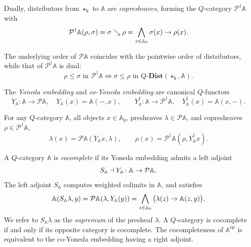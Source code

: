 \documentclass{tac}
\begin{document}
Dually, distributors from \(\star_\mathrm{k}\) to \(\mathbb{A}\) are \emph{copresheaves}, forming the \(Q\)-category \(\mathcal{P}^{\dagger}\mathbb{A}\) with
\begin{equation*}
\mathcal{P}^{\dagger}\mathbb{A}(\rho,\sigma)=\sigma\searrow\rho
=\bigwedge_{x\in\mathbb{A}_0}\sigma(x)\rightarrow\rho(x).
\end{equation*}

The underlying order of \(\mathcal{P}\mathbb{A}\) coincides with the pointwise order of distributors, while that of \(\mathcal{P}^{\dagger}\mathbb{A}\) is dual:
\begin{equation*}
\rho\leq\sigma\text{ in } \mathcal{P}^{\dagger}\mathbb{A} \iff \sigma\leq\rho\text{ in } Q\text{-}\mathbf{Dist}(\star_\mathrm{k},\mathbb{A}).
\end{equation*}

The \emph{Yoneda embedding} and \emph{co-Yoneda embedding} are canonical \(Q\)-functors
\begin{equation*}
Y_{\mathbb{A}}\colon\mathbb{A}\to\mathcal{P}\mathbb{A},\quad Y_{\mathbb{A}}(x)=\mathbb{A}(-,x),
\qquad
Y_{\mathbb{A}}^\dagger\colon\mathbb{A}\to\mathcal{P}^\dagger\mathbb{A},\quad Y_{\mathbb{A}}^\dagger(x)=\mathbb{A}(x,-).
\end{equation*}

\begin{lemma}[Yoneda] \label{lem:yoneda}
For any \(Q\)-category \(\mathbb{A}\), all objects \(x\in\mathbb{A}_0\), presheaves \(\lambda\in\mathcal{P}\mathbb{A}\), and copresheaves \(\rho\in\mathcal{P}^{\dagger}\mathbb{A}\),
\begin{equation*}
\lambda(x)=\mathcal{P}\mathbb{A}(Y_{\mathbb{A}}x,\lambda),\qquad
\rho(x)=\mathcal{P}^{\dagger}\mathbb{A}(\rho,Y_{\mathbb{A}}^\dagger x).
\end{equation*}
\end{lemma}

A \(Q\)-category \(\mathbb{A}\) is \emph{cocomplete} \cite{Stubbe2005a} if its Yoneda embedding admits a left adjoint 
\[S_{\mathbb{A}}\dashv Y_{\mathbb{A}}\colon\mathbb{A}\to\mathcal{P}\mathbb{A}.\]
 The left adjoint \(S_{\mathbb{A}}\) computes weighted colimits in \(\mathbb{A}\), and satisfies
\begin{equation*}
\mathbb{A}(S_{\mathbb{A}}\lambda,y)=\mathcal{P}\mathbb{A}(\lambda,Y_{\mathbb{A}}(y))
=\bigwedge_{z\in\mathbb{A}_0}\big(\lambda(z)\ra\mathbb{A}(z,y)\big).
\end{equation*}
We refer to \(S_{\mathbb{A}}\lambda\) as the \emph{supremum} of the presheaf \(\lambda\). 
A \(Q\)-category is cocomplete if and only if its opposite category is cocomplete. The cocompleteness of \(\mathbb{A}^\mathrm{op}\) is equivalent to the co-Yoneda embedding having a right adjoint.
\end{document}
